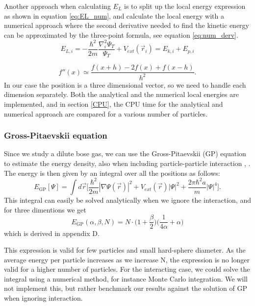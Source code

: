 \documentclass[norsk,a4paper,12pt]{article}
\begin{document}
Another approach when calculating $E_L$ is to split up the local energy expression as shown in equation \ref{eq:EL_num}, and calculate the local energy with a numerical approach where the second derivative needed to find the kinetic energy can be approximated by the three-point formula, see equation \ref{eq:num_derv}.
\begin{equation}
\label{eq:EL_num}
E_{L,i}=-\frac{\hbar^2}{2m}\frac{\nabla_i^2\Psi_T}{\Psi_T}+V_{ext}(\vec{r}_i)=E_{k,i}+E_{p,i}
\end{equation}

\begin{equation}
\label{eq:num_derv}
f''(x)\simeq\frac{f(x+h)-2f(x)+f(x-h)}{h^2}.
\end{equation}
In our case the position is a three dimensional vector, so we need to handle each dimension separately. Both the analytical and the numerical local energies are implemented, and in section \ref{CPU}, the CPU time for the analytical and numerical approach are compared for a various number of particles.
 

\subsubsection{Gross-Pitaevskii equation}
Since we study a dilute bose gas, we can use the Gross-Pitaevskii (GP) equation to estimate the energy density, also when including particle-particle interaction \cite{Gross}, \cite{Pitaevskii}. The energy is then given by an integral over all the positions \cite{Nilsen} as follows:
\begin{equation}
E_{\text{GP}}[\Psi]=\int d\vec{r}\bigg[\frac{\hbar^2}{2m}|\nabla\Psi(\vec{r})|^2+V_{ext}(\vec{r})|\Psi|^2+\frac{2\pi\hbar^2a}{m}|\Psi|^4\bigg].
\label{eq:GP_integral}
\end{equation}
This integral can easily be solved analytically when we ignore the interaction, and for three dimentions we get
\begin{equation}
\label{eq:GP}
E_{\text{GP}}(\alpha, \beta, N)=N\cdot\bigg(1+\frac{\beta}{2}\bigg)\bigg(\frac{1}{4\alpha}+\alpha\bigg)
\end{equation}
 which is derived in appendix D.

This expression is valid for few particles and small hard-sphere diameter. As the average energy per particle  increases as we increase N, the expression is no longer valid for a higher number of particles. For the interacting case, we could solve the integral using a numerical method, for instance Monte Carlo integration. We will not implement this, but rather benchmark our results against the solution of GP when ignoring interaction.
\end{document}
